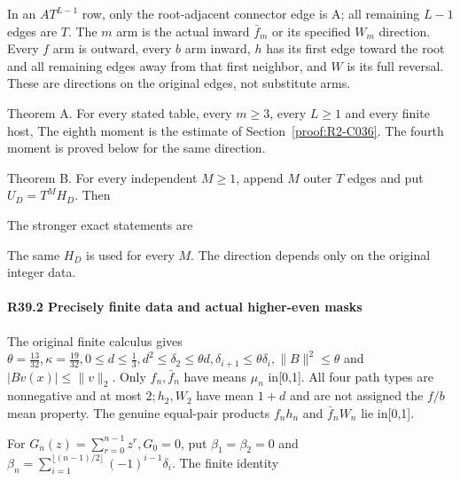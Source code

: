 In an \(A T^{L-1}\) row, only the root-adjacent connector edge is A; all remaining \(L-1\) edges are \(T\). The \(m\) arm is the actual inward \(\bar f_m\) or its specified \(W_m\) direction. Every \(f\) arm is outward, every \(b\) arm inward, \(h\) has its first edge toward the root and all remaining edges away from that first neighbor, and \(W\) is its full reversal. These are directions on the original edges, not substitute arms.

Theorem A. For every stated table, every \(m\ge3\), every
\(L\ge1\) and every finite host,
The eighth moment is the estimate of Section~\ref{proof:R2-C036}.
The fourth moment is proved below for the same direction.

Theorem B. For every independent \(M\ge1\), append \(M\)
outer \(T\) edges and put \(U_D=T^MH_D\). Then

The stronger exact statements are


The same \(H_D\) is used for every \(M\). The direction depends
only on the original integer data.

\paragraph{R39.2 Precisely finite data and actual higher-even masks}\label{part:R39.2}

The original finite calculus gives \(\theta=\frac{13}{32},\allowbreak \allowbreak \kappa=\frac{19}{32},\allowbreak \allowbreak  0\le d\le \frac{1}{3},\allowbreak \allowbreak d^2\le \delta_2\le \theta d,\allowbreak \allowbreak \delta_{i+1}\le \theta \delta_i,\allowbreak \allowbreak  \lVert B\rVert ^2\le \theta\) and \(\lvert Bv(x)\rvert \le \lVert v\rVert_2\). Only \(f_n,\allowbreak \allowbreak \bar f_n\) have means \(\mu_n\) in[0,1]. All four path types are nonnegative and at most \(2; h_{2},\allowbreak \allowbreak W_{2}\) have mean \(1+d\) and are not assigned the \(f/b\) mean property. The genuine equal-pair products \(f_n h_n\) and \(\bar f_n W_n\) lie in[0,1].

For \(G_n(z)=\sum_{r=0}^{n-1}z^r,\allowbreak \allowbreak  G_{0}=0\), put \(\beta_{1}=\beta_{2}=0\) and \(\beta_n=\sum_{i=1}^{{\lfloor (n-1)/2\rfloor}}(-1)^{i-1}\delta_i\). The finite identity

